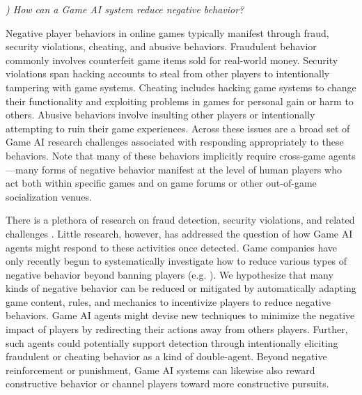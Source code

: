 \documentclass[conference]{IEEEtran}
\newcounter{questionno}
\newcommand{\subsubsectionx}[1]{{\em {\arabic{questionno}) #1}}
	\addtocounter{questionno}{1}
	}
\begin{document}
\subsubsectionx{How can a Game AI system reduce negative behavior?}
%
Negative player behaviors in online games typically manifest through fraud, security violations, cheating, and abusive behaviors. 
Fraudulent behavior commonly involves counterfeit game items sold for real-world money. 
Security violations span hacking accounts to steal from other players to intentionally tampering with game systems. 
Cheating includes hacking game systems to change their functionality and exploiting problems in games for personal gain or harm to others. 
Abusive behaviors involve insulting other players or intentionally attempting to ruin their game experiences. 
Across these issues are a broad set of Game AI research challenges associated with responding appropriately to these behaviors. 
Note that many of these behaviors implicitly require cross-game agents---many forms of negative behavior manifest at the level of human players who act both within specific games and on game forums or other out-of-game socialization venues.

There is a plethora of research on fraud detection, security violations, and related challenges \cite{phua2010:fraud-detection-review}. 
Little research, however, has addressed the question of how Game AI agents might respond to these activities once detected. 
Game companies have only recently begun to systematically investigate how to reduce various types of negative behavior beyond banning players (e.g. \cite{lin2013:toxic-behav}). 
%
%
We hypothesize that many kinds of negative behavior can be reduced or mitigated by automatically adapting game content, rules, and mechanics to incentivize players to reduce negative behaviors.
Game AI agents might devise new techniques to minimize the negative impact of players by redirecting their actions away from others players. 
Further, such agents could potentially support detection through intentionally eliciting fraudulent or cheating behavior as a kind of double-agent.  
Beyond negative reinforcement or punishment, Game AI systems can likewise also reward constructive behavior or channel players toward more constructive pursuits.
\end{document}
